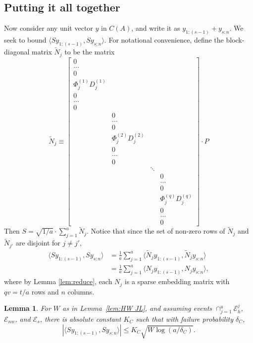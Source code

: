 \documentclass{sig-alternate}
\newcommand{\cE}{\mathcal{E}}
\newcommand\scn{_{s:n}}
\newcommand\vk{1/a}
\newcommand\kv{a}
\newcommand\fvk{\frac{1}{a}}
\newtheorem{lemma}[theorem]{Lemma}
\begin{document}
\subsection{Putting it all together}
Now consider any unit vector $y$ in $C(A)$, and write it as $y_{1:(s-1)} + y\scn$.
We seek to bound
$\langle Sy_{1:(s-1)} , Sy\scn  \rangle$. For notational convenience, define 
the block-diagonal matrix $\tilde{N}_j$ to be the matrix 
\[
\tilde{N}_j \equiv \left[
\begin{matrix}
0 & &\\
\ldots & &\\
0 & &\\
\Phi^{(1)}_j D^{(1)}_j & &\\
0 & &\\
\ldots & &\\
0 & &\\
& 0 &\\
& \ldots & \\
& 0 &\\
& \Phi^{(2)}_j D^{(2)}_j &&\\
& 0 &\\
& \ldots &\\
& 0 &\\
&& \ddots & \\
&&& 0\\
&&& \ldots \\
&&& 0\\
&&& \Phi^{(q)}_j D^{(q)}_j \\
&&& 0\\
&&& \ldots\\
&&& 0
\end{matrix}
\right] \cdot P
\]
Then $S = \sqrt{\vk} \cdot \sum_{j=1}^{\kv} \tilde{N}_j$. Notice that since the set of non-zero rows of
$\tilde{N}_j$ and $\tilde{N}_{j'}$ are disjoint for $j \neq j'$,
\begin{align}\label{eq:blockTZ}
\langle Sy_{1:(s-1)}, Sy\scn \rangle
	   & = \fvk \sum_{j=1}^{\kv} \langle \tilde{N}_j y_{1:(s-1)}, \tilde{N}_j y\scn \rangle\nonumber
	\\ & = \fvk \sum_{j=1}^{\kv} \langle N_j y_{1:(s-1)}, N_j y\scn \rangle,
\end{align}
where by Lemma \ref{lem:reduce}, each $N_j$ is a sparse embedding matrix with $qv = t/\kv$ rows and $n$ columns.

\begin{lemma}\label{lem:cross terms JL}
For $W$ as in Lemma~\ref{lem:HW JL}, and assuming events $\cap_{j=1}^{\kv} \cE_h^j$,
$\mathcal{E}_{nw}$, and $\cE_s$,
there is absolute constant $K_C$ such that with failure probability $\delta_C$,
\[
| \langle Sy_{1:(s-1)}, Sy\scn \rangle | \le K_C \sqrt{W \log(a/\delta_C)}.
\]
\end{lemma}
\end{document}
